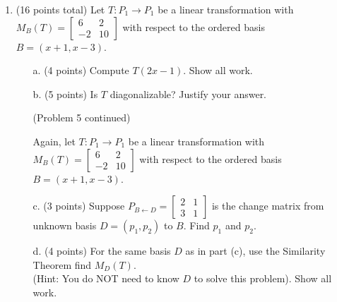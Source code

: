 \documentclass[12pt]{extarticle}
\begin{document}
\begin{enumerate}
\begin{itemize}
\vfill



\end{itemize}

\newpage  

\item (16 points total) Let $T:P_1\to P_1$ be a linear transformation with \\$M_B(T)=\left[\begin{array}{cc}
6 & 2 
\\
 -2 & 10 
\end{array}\right]$ with respect to the ordered basis $B=(x+1,x-3)$.

\begin{itemize}

\item[a.] (4 points) Compute $T(2x-1)$. Show all work.
\vspace{3in}

\item[b.] (5 points) Is $T$ diagonalizable? Justify your answer.


\vfill


\newpage (Problem 5 continued)

Again, let $T:P_1\to P_1$ be a linear transformation with \\$M_B(T)=\left[\begin{array}{cc}
6 & 2 
\\
 -2 & 10 
\end{array}\right]$ with respect to the ordered basis $B=(x+1,x-3)$.

\item[c.] (3 points) Suppose $P_{B\leftarrow D}=\begin{bmatrix} 2 & 1 \\ 3 & 1\end{bmatrix}$ is the change matrix from unknown basis $D=(p_1,p_2)$ to $B$. Find $p_1$ and $p_2$.

\vspace{2.5in}

\item[d.] (4 points) For the same basis $D$  as in part (c), use the Similarity Theorem find $M_D(T)$.\\ (Hint: You do NOT need to know $D$ to solve this problem). Show all work.

 \end{itemize}

 \newpage


\end{enumerate}
\end{document}
